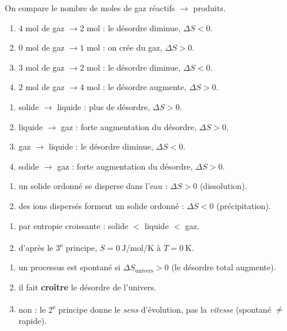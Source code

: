 \documentclass[11pt,a4paper]{article}
\begin{document}
\begin{corrige}
On compare le nombre de moles de gaz réactifs $\to$ produits.
\begin{enumerate}[label=\alph*)]
  \item $4$ mol de gaz $\to 2$ mol : le désordre diminue, $\Delta S<0$.
  \item $0$ mol de gaz $\to 1$ mol : on crée du gaz, $\Delta S>0$.
  \item $3$ mol de gaz $\to 2$ mol : le désordre diminue, $\Delta S<0$.
  \item $2$ mol de gaz $\to 4$ mol : le désordre augmente, $\Delta S>0$.
\end{enumerate}
\end{corrige}

\begin{corrige}
\begin{enumerate}[label=\alph*)]
  \item solide $\to$ liquide : plus de désordre, $\Delta S>0$.
  \item liquide $\to$ gaz : forte augmentation du désordre, $\Delta S>0$.
  \item gaz $\to$ liquide : le désordre diminue, $\Delta S<0$.
  \item solide $\to$ gaz : forte augmentation du désordre, $\Delta S>0$.
\end{enumerate}
\end{corrige}

\begin{corrige}
\begin{enumerate}[label=\alph*)]
  \item un solide ordonné se disperse dans l'eau : $\Delta S>0$ (dissolution).
  \item des ions dispersés forment un solide ordonné : $\Delta S<0$ (précipitation).
\end{enumerate}
\end{corrige}

\begin{corrige}
\begin{enumerate}[label=\alph*)]
  \item par entropie croissante : \; solide $<$ liquide $<$ gaz.
  \item d'après le 3\textsuperscript{e} principe, $S = \qty{0}{\joule\per\mol\per\kelvin}$ à $T=\qty{0}{\kelvin}$.
\end{enumerate}
\end{corrige}

\begin{corrige}
\begin{enumerate}[label=\alph*)]
  \item un processus est spontané si $\Delta S_{\text{univers}} > 0$ (le désordre total augmente).
  \item il fait \textbf{croître} le désordre de l'univers.
  \item non : le 2\textsuperscript{e} principe donne le \emph{sens} d'évolution, pas la \emph{vitesse} (spontané $\ne$ rapide).
\end{enumerate}
\end{corrige}
\end{document}
